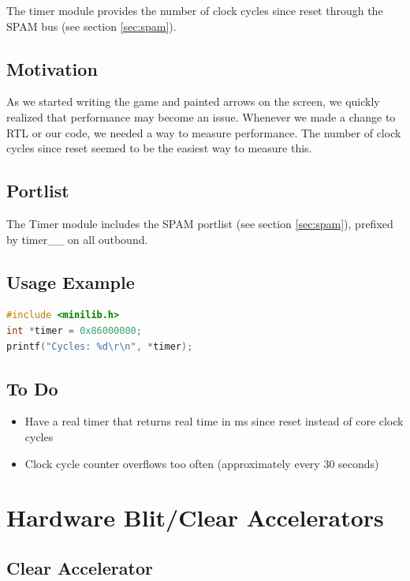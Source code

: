 \documentclass[10pt]{article}
\begin{document}
\label{sec:timer}

The timer module provides the number of clock cycles since reset through the
SPAM bus (see section \ref{sec:spam}).

\subsection{Motivation}

As we started writing the game and painted arrows on the screen, we quickly
realized that performance may become an issue. Whenever we made a change to
RTL or our code, we needed a way to measure performance. The number of clock
cycles since reset seemed to be the easiest way to measure this.

\subsection{Portlist}

The Timer module includes the SPAM portlist (see section \ref{sec:spam}),
prefixed by timer\_\_ on all outbound.

\subsection{Usage Example}
\begin{lstlisting}[basicstyle=\footnotesize,language=C]
#include <minilib.h>
int *timer = 0x86000000;
printf("Cycles: %d\r\n", *timer);
\end{lstlisting}

\subsection{To Do}

\begin{itemize}
\item{Have a real timer that returns real time in ms since reset instead of
core clock cycles}
\item{Clock cycle counter overflows too often (approximately every 30
seconds)}
\end{itemize}

\section{Hardware Blit/Clear Accelerators}
\label{sec:accel}

\subsection{Clear Accelerator}
\end{document}
